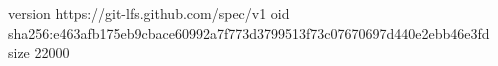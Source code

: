 version https://git-lfs.github.com/spec/v1
oid sha256:e463afb175eb9cbace60992a7f773d3799513f73c07670697d440e2ebb46e3fd
size 22000
